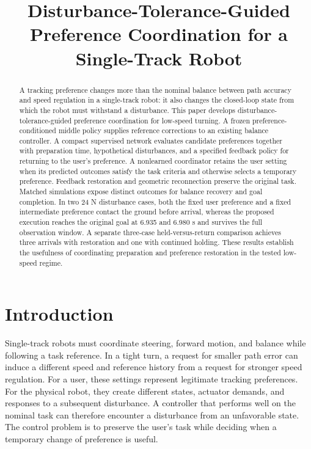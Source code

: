 \documentclass[journal]{IEEEtran}
\begin{document}
\title{Disturbance-Tolerance-Guided Preference Coordination for a Single-Track Robot}
\author{}
\maketitle
\begin{abstract}
A tracking preference changes more than the nominal balance between path accuracy and speed regulation in a single-track robot: it also changes the closed-loop state from which the robot must withstand a disturbance. This paper develops disturbance-tolerance-guided preference coordination for low-speed turning. A frozen preference-conditioned middle policy supplies reference corrections to an existing balance controller. A compact supervised network evaluates candidate preferences together with preparation time, hypothetical disturbances, and a specified feedback policy for returning to the user's preference. A nonlearned coordinator retains the user setting when its predicted outcomes satisfy the task criteria and otherwise selects a temporary preference. Feedback restoration and geometric reconnection preserve the original task. Matched simulations expose distinct outcomes for balance recovery and goal completion. In two 24 N disturbance cases, both the fixed user preference and a fixed intermediate preference contact the ground before arrival, whereas the proposed execution reaches the original goal at 6.935 and 6.980 s and survives the full observation window. A separate three-case held-versus-return comparison achieves three arrivals with restoration and one with continued holding. These results establish the usefulness of coordinating preparation and preference restoration in the tested low-speed regime.
\end{abstract}
\section{Introduction}

Single-track robots must coordinate steering, forward motion, and balance while following a task reference. In a tight turn, a request for smaller path error can induce a different speed and reference history from a request for stronger speed regulation. For a user, these settings represent legitimate tracking preferences. For the physical robot, they create different states, actuator demands, and responses to a subsequent disturbance. A controller that performs well on the nominal task can therefore encounter a disturbance from an unfavorable state. The control problem is to preserve the user's task while deciding when a temporary change of preference is useful.
\end{document}
